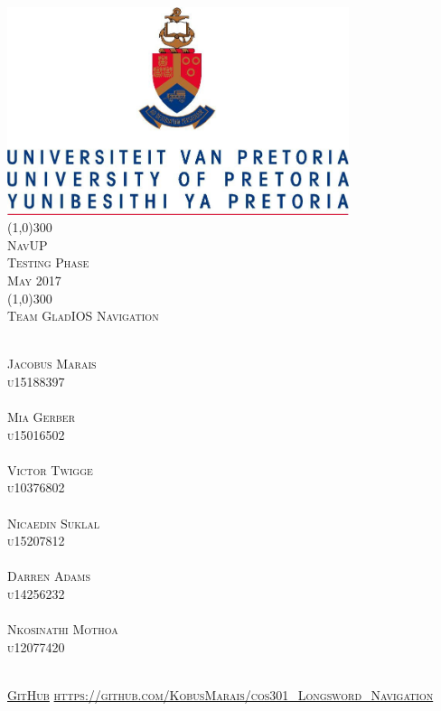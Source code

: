\documentclass[runningheads,a4paper]{article}
\begin{document}
\begin{titlepage}
\begin{center}
\includegraphics[width=10cm]{UP.jpg}  \\
[1cm]
\line(1,0){300} \\
[0.3cm]
\textsc{\Large
NavUP \\
Testing Phase \\
\hfill {} May 2017
}\\
[0.1cm]
\line(1,0){300} \\
[0.7cm]
\textsc{\Large
Team GladIOS Navigation
} \\
\end{center}
\begin{center}
\begin{multicols}{2}
\textsc{\large\\
Jacobus Marais\\ 
u15188397\\ 
}
\textsc{\large\\
Mia Gerber\\
u15016502\\ 
}
\textsc{\large\\
Victor Twigge\\
u10376802\\ 
}
\columnbreak
\textsc{\large\\
Nicaedin Suklal\\
u15207812\\
}
\textsc{\large\\
Darren Adams\\
u14256232\\
}
\textsc{\large\\
Nkosinathi Mothoa\\
u12077420\\
}
\end{multicols}
\textsc{	\\ \href{https://github.com/KobusMarais/cos301_Longsword_Navigation}{GitHub}
\url{https://github.com/KobusMarais/cos301_Longsword_Navigation}}
\end{center}
\end{titlepage}
\end{document}
